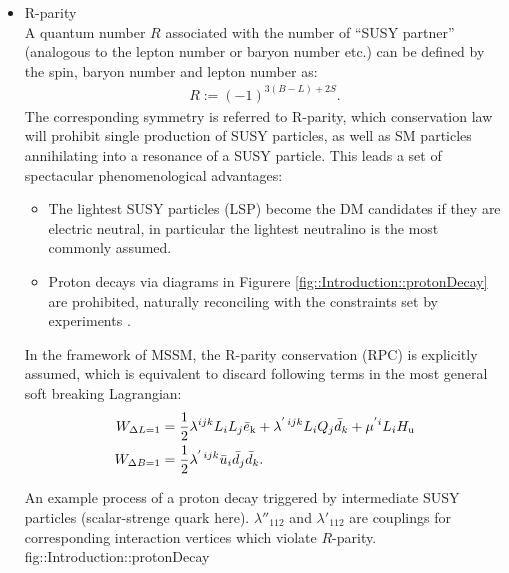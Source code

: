 \begin{itemize}
\item R-parity  \\
A quantum number $R$ associated with the number of ``SUSY partner'' (analogous to the lepton number or baryon number etc.) can be defined by the spin, baryon number and lepton number as:
\begin{align}
R := (-1)^{3(B-L)+2S}.
\end{align}
The corresponding symmetry is referred to R-parity, which conservation law will prohibit single production of SUSY particles, as well as SM particles annihilating into a resonance of a SUSY particle. 
This leads a set of spectacular phenomenological advantages: 
\begin{itemize}
\item The lightest SUSY particles (LSP) become the DM candidates if they are electric neutral, in particular the lightest neutralino is the most commonly assumed. 
\item Proton decays via diagrams in Figurere \ref{fig::Introduction::protonDecay} are prohibited, naturally reconciling with the constraints set by experiments \cite{protonDecaySuperK}.
\end{itemize}
In the framework of MSSM, the R-parity conservation (RPC) is explicitly assumed, which is equivalent to discard following terms in the most general soft breaking Lagrangian:
\begin{align}
W_{\Delta L=1} & = \frac{1}{2} \lambda^{ijk} L_i L_j \bar{e}_\mathrm{k} + \lambda^{'\, ijk} L_i Q_j \bar{d}_k + \mu^{'i} L_i H_{\mathrm{u}} \nonumber \\
W_{\Delta B=1} & = \frac{1}{2} \lambda^{'\, ijk} \bar{u}_i  \bar{d}_j  \bar{d}_k.
\label{eq::RPVterms}
\end{align}

{An example process of a proton decay triggered by intermediate SUSY particles (scalar-strenge quark here). $\lambda''_{112}$ and $\lambda'_{112}$ are couplings for corresponding interaction vertices which violate $R$-parity.}
{fig::Introduction::protonDecay}

\end{itemize}

